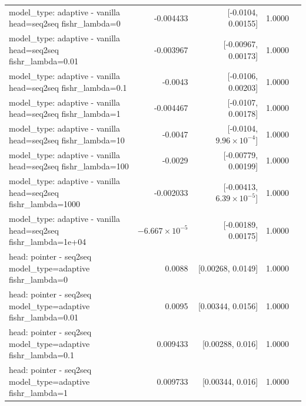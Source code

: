 \documentclass[10pt]{article}
\makeatletter
\newcommand{\stackcell}[1]{\begin{tabular}[t]{@{}l@{}}#1\end{tabular}}
\makeatother
\begin{document}
{\begin{longtable}{lrrrl}
\stackcell{model\_type: adaptive - vanilla\\\footnotesize head=seq2seq fishr\_lambda=0 } & -0.004433 & [-0.0104, 0.00155] & 1.0000 & \\
\stackcell{model\_type: adaptive - vanilla\\\footnotesize head=seq2seq fishr\_lambda=0.01 } & -0.003967 & [-0.00967, 0.00173] & 1.0000 & \\
\stackcell{model\_type: adaptive - vanilla\\\footnotesize head=seq2seq fishr\_lambda=0.1 } & -0.0043 & [-0.0106, 0.00203] & 1.0000 & \\
\stackcell{model\_type: adaptive - vanilla\\\footnotesize head=seq2seq fishr\_lambda=1 } & -0.004467 & [-0.0107, 0.00178] & 1.0000 & \\
\stackcell{model\_type: adaptive - vanilla\\\footnotesize head=seq2seq fishr\_lambda=10 } & -0.0047 & [-0.0104, $9.96\times10^{-4}$] & 1.0000 & \\
\stackcell{model\_type: adaptive - vanilla\\\footnotesize head=seq2seq fishr\_lambda=100 } & -0.0029 & [-0.00779, 0.00199] & 1.0000 & \\
\stackcell{model\_type: adaptive - vanilla\\\footnotesize head=seq2seq fishr\_lambda=1000 } & -0.002033 & [-0.00413, $6.39\times10^{-5}$] & 1.0000 & \\
\stackcell{model\_type: adaptive - vanilla\\\footnotesize head=seq2seq fishr\_lambda=1e+04 } & $-6.667\times10^{-5}$ & [-0.00189, 0.00175] & 1.0000 & \\
\stackcell{head: pointer - seq2seq\\\footnotesize model\_type=adaptive fishr\_lambda=0 } & 0.0088 & [0.00268, 0.0149] & 1.0000 & \\
\stackcell{head: pointer - seq2seq\\\footnotesize model\_type=adaptive fishr\_lambda=0.01 } & 0.0095 & [0.00344, 0.0156] & 1.0000 & \\
\stackcell{head: pointer - seq2seq\\\footnotesize model\_type=adaptive fishr\_lambda=0.1 } & 0.009433 & [0.00288, 0.016] & 1.0000 & \\
\stackcell{head: pointer - seq2seq\\\footnotesize model\_type=adaptive fishr\_lambda=1 } & 0.009733 & [0.00344, 0.016] & 1.0000 & \\

\end{longtable}}
\end{document}

